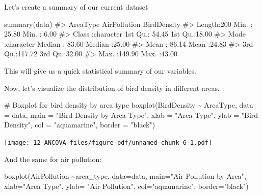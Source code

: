 \documentclass[
  letterpaper,
  DIV=11,
  numbers=noendperiod]{scrreprt}
\newenvironment{Shaded}{\begin{snugshade}}{\end{snugshade}}
\newcommand{\AttributeTok}[1]{\textcolor[rgb]{0.40,0.45,0.13}{#1}}
\newcommand{\CommentTok}[1]{\textcolor[rgb]{0.37,0.37,0.37}{#1}}
\newcommand{\FunctionTok}[1]{\textcolor[rgb]{0.28,0.35,0.67}{#1}}
\newcommand{\NormalTok}[1]{\textcolor[rgb]{0.00,0.23,0.31}{#1}}
\newcommand{\SpecialCharTok}[1]{\textcolor[rgb]{0.37,0.37,0.37}{#1}}
\newcommand{\StringTok}[1]{\textcolor[rgb]{0.13,0.47,0.30}{#1}}
\begin{document}
Let's create a summary of our current dataset

\begin{Shaded}
\begin{Highlighting}[]
\FunctionTok{summary}\NormalTok{(data)}
\CommentTok{\#\textgreater{}    AreaType          AirPollution     BirdDensity   }
\CommentTok{\#\textgreater{}  Length:200         Min.   : 25.80   Min.   : 6.00  }
\CommentTok{\#\textgreater{}  Class :character   1st Qu.: 54.45   1st Qu.:18.00  }
\CommentTok{\#\textgreater{}  Mode  :character   Median : 83.60   Median :25.00  }
\CommentTok{\#\textgreater{}                     Mean   : 86.14   Mean   :24.83  }
\CommentTok{\#\textgreater{}                     3rd Qu.:117.72   3rd Qu.:32.00  }
\CommentTok{\#\textgreater{}                     Max.   :149.90   Max.   :43.00}
\end{Highlighting}
\end{Shaded}

This will give us a quick statistical summary of our variables.

Now, let's visualize the distribution of bird density in different
areas.

\begin{Shaded}
\begin{Highlighting}[]

\CommentTok{\# Boxplot for bird density by area type}
\FunctionTok{boxplot}\NormalTok{(BirdDensity }\SpecialCharTok{\textasciitilde{}}\NormalTok{ AreaType, }\AttributeTok{data =}\NormalTok{ data, }
        \AttributeTok{main =} \StringTok{"Bird Density by Area Type"}\NormalTok{, }
        \AttributeTok{xlab =} \StringTok{"Area Type"}\NormalTok{, }\AttributeTok{ylab =} \StringTok{"Bird Density"}\NormalTok{, }
        \AttributeTok{col =} \StringTok{"aquamarine"}\NormalTok{, }\AttributeTok{border =} \StringTok{"black"}\NormalTok{)}
\end{Highlighting}
\end{Shaded}

\texttt{[image: 12-ANCOVA\_files/figure-pdf/unnamed-chunk-6-1.pdf]}

And the same for air pollution:

\begin{Shaded}
\begin{Highlighting}[]
\FunctionTok{boxplot}\NormalTok{(AirPollution }\SpecialCharTok{\textasciitilde{}}\NormalTok{area\_type, }\AttributeTok{data=}\NormalTok{data, }\AttributeTok{main=}\StringTok{"Air Pollution by Area"}\NormalTok{, }\AttributeTok{xlab=}\StringTok{"Area Type"}\NormalTok{, }\AttributeTok{ylab=} \StringTok{"Air Pollution"}\NormalTok{, }\AttributeTok{col=}\StringTok{"aquamarine"}\NormalTok{, }\AttributeTok{border=}\StringTok{"black"}\NormalTok{)}
\end{Highlighting}
\end{Shaded}
\end{document}
